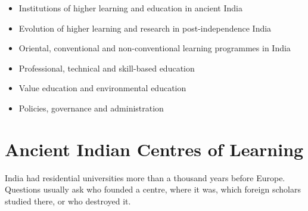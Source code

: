 

\begin{sylbox}

\begin{itemize}
\tightlist
\item[$\square$]
  Institutions of higher learning and education in ancient India
\item[$\square$]
  Evolution of higher learning and research in post-independence India
\item[$\square$]
  Oriental, conventional and non-conventional learning programmes in India
\item[$\square$]
  Professional, technical and skill-based education
\item[$\square$]
  Value education and environmental education
\item[$\square$]
  Policies, governance and administration
\end{itemize}

\end{sylbox}

\needspace{160pt}

\hypertarget{p1-10--1-ancient-indian-centres-of-learning}{%
\section{Ancient Indian Centres of Learning}\label{p1-10--1-ancient-indian-centres-of-learning}}

India had residential universities more than a thousand years before Europe. Questions usually ask who
founded a centre, where it was, which foreign scholars studied there, or who destroyed it.

\begingroup\small

